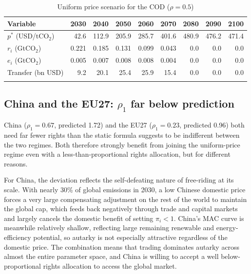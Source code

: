 \documentclass[12pt,english]{article}
\begin{document}
\begin{table}[h]
\centering
\caption{Uniform price scenario for the COD ($\rho=0.5$)}
\renewcommand{\arraystretch}{1.2}
\begin{tabular}{lrrrrrrrr}
  \toprule
  \textbf{Variable} & \textbf{2030} & \textbf{2040} & \textbf{2050} & \textbf{2060} & \textbf{2070} & \textbf{2080} & \textbf{2090} & \textbf{2100} \\
  \hline
  $p^*$ (USD/tCO$_2$) & 42.6 & 112.9 & 205.9 & 285.7 & 401.6 & 480.9 & 476.2 & 471.4 \\
  $r_i$ (GtCO$_2$) & 0.221 & 0.185 & 0.131 & 0.099 & 0.043 & 0.0 & 0.0 & 0.0 \\
  $e_i$ (GtCO$_2$) & 0.005 & 0.007 & 0.008 & 0.008 & 0.004 & 0.0 & 0.0 & 0.0 \\
  Transfer (bn USD) & 9.2 & 20.1 & 25.4 & 25.9 & 15.4 & 0.0 & 0.0 & 0.0 \\
  \bottomrule
  \label{tab:uniform_cod}
\end{tabular}
\end{table}

\subsection{China and the EU27: $\rho_1$ far below prediction}

China ($\rho_1 = 0.67$, predicted 1.72) and the EU27 ($\rho_1 = 0.23$, predicted 0.96) both need far fewer rights than the static formula suggests to be indifferent between the two regimes. Both therefore strongly benefit from joining the uniform-price regime even with a less-than-proportional rights allocation, but for different reasons.

For China, the deviation reflects the self-defeating nature of free-riding at its scale. With nearly 30\% of global emissions in 2030, a low Chinese domestic price forces a very large compensating adjustment on the rest of the world to maintain the global cap, which feeds back negatively through trade and capital markets and largely cancels the domestic benefit of setting $\pi_i < 1$. China's MAC curve is meanwhile relatively shallow, reflecting large remaining renewable and energy-efficiency potential, so autarky is not especially attractive regardless of the domestic price. The combination means that trading dominates autarky across almost the entire parameter space, and China is willing to accept a well below-proportional rights allocation to access the global market.
\end{document}
